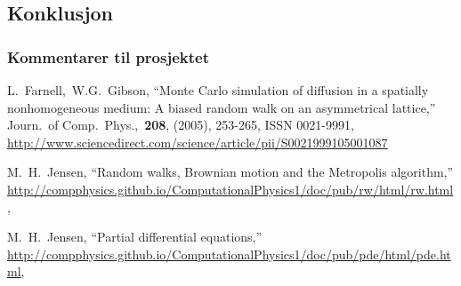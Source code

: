 \documentclass[norsk, 10pt]{article}
\begin{document}

\subsection*{Konklusjon}

\subsubsection*{Kommentarer til prosjektet}
\begin{thebibliography}{9}
L.~Farnell,~W.G.~Gibson,
``Monte Carlo simulation of diffusion in a spatially nonhomogeneous medium: A biased random walk on an asymmetrical lattice,''
Journ.\ of Comp.\ Phys.,\ {\bf208}, (2005), 253-265, ISSN 0021-9991, \url{http://www.sciencedirect.com/science/article/pii/S0021999105001087}

M.~H.~Jensen,
``Random walks, Brownian motion and the Metropolis algorithm,''
\url{http://compphysics.github.io/ComputationalPhysics1/doc/pub/rw/html/rw.html}, 

M.~H.~Jensen,
``Partial differential equations,''
\url{http://compphysics.github.io/ComputationalPhysics1/doc/pub/pde/html/pde.html}, 


\end{thebibliography}  
\end{document}
